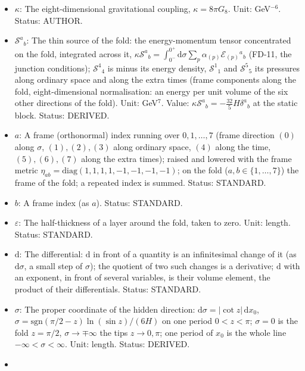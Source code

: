 \documentclass[
  10pt,
]{article}
\providecommand{\tightlist}{%
  \setlength{\itemsep}{0pt}\setlength{\parskip}{0pt}}
\begin{document}
\begin{itemize}
\tightlist
\item
  \(\kappa\): The eight-dimensional gravitational coupling,
  \(\kappa = 8\pi G_8\). Unit: GeV\(^{-6}\). Status: AUTHOR.
\item
  \(\mathcal{S}^a{}_b\): The thin source of the fold: the
  energy-momentum tensor concentrated on the fold, integrated across it,
  \(\kappa\mathcal{S}^a{}_b = \int_{0^-}^{0^+}\mathrm{d}\sigma\sum_p\alpha_{(p)}\mathcal{E}_{(p)}{}^a{}_b\)
  (FD-11, the junction conditions); \(\mathcal{S}^4{}_4\) is minus its
  energy density, \(\mathcal{S}^1{}_1\) and \(\mathcal{S}^5{}_5\) its
  pressures along ordinary space and along the extra times (frame
  components along the fold, eight-dimensional normalisation: an energy
  per unit volume of the six other directions of the fold). Unit:
  GeV\(^7\). Value:
  \(\kappa\mathcal{S}^a{}_b = -\frac{32}{5}H\delta^a{}_b\) at the static
  block. Status: DERIVED.
\item
  \(a\): A frame (orthonormal) index running over \(0, 1, \dots, 7\)
  (frame direction \((0)\) along \(\sigma\), \((1), (2), (3)\) along
  ordinary space, \((4)\) along the time, \((5), (6), (7)\) along the
  extra times); raised and lowered with the frame metric
  \(\eta_{ab} = \mathrm{diag}(1, 1, 1, 1, -1, -1, -1, -1)\); on the fold
  (\(a, b \in \{1, \dots, 7\}\)) the frame of the fold; a repeated index
  is summed. Status: STANDARD.
\item
  \(b\): A frame index (as \(a\)). Status: STANDARD.
\item
  \(\varepsilon\): The half-thickness of a layer around the fold, taken
  to zero. Unit: length. Status: STANDARD.
\item
  \(\mathrm{d}\): The differential: \(\mathrm{d}\) in front of a
  quantity is an infinitesimal change of it (as \(\mathrm{d}\sigma\), a
  small step of \(\sigma\)); the quotient of two such changes is a
  derivative; \(\mathrm{d}\) with an exponent, in front of several
  variables, is their volume element, the product of their
  differentials. Status: STANDARD.
\item
  \(\sigma\): The proper coordinate of the hidden direction:
  \(\mathrm{d}\sigma = \lvert\cot z\rvert\,\mathrm{d}x_0\),
  \(\sigma = \mathrm{sgn}(\pi/2 - z)\ln(\sin z)/(6H)\) on one period
  \(0 < z < \pi\); \(\sigma = 0\) is the fold \(z = \pi/2\),
  \(\sigma \to \mp\infty\) the tips \(z \to 0, \pi\); one period of
  \(x_0\) is the whole line \(-\infty < \sigma < \infty\). Unit: length.
  Status: DERIVED.
\item

\end{itemize}
\end{document}
